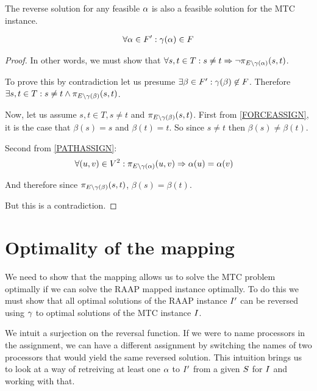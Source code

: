 \begin{lemma}
\label{REVERSEFEASABLE}
The reverse solution for any feasible $\alpha$ is also a feasible solution for the MTC instance.

\begin{align}
	\nonumber \forall \alpha \in F' : \gamma(\alpha) \in F
\end{align}
\end{lemma}
\begin{proof}
In other words, we must show that $\forall s, t \in T : s \neq t \Rightarrow \neg\pi_{E \setminus \gamma(\alpha)}(s, t)$.

To prove this by contradiction let us presume $\exists \beta \in F' : \gamma(\beta) \not\in F$.
Therefore $\exists s, t \in T : s \neq t \wedge \pi_{E \setminus \gamma(\beta)}(s, t)$.

Now, let us assume $s, t \in T, s \neq t$ and $\pi_{E \setminus \gamma(\beta)}(s, t)$.
First from \ref{FORCEASSIGN}, it is the case that $\beta(s) = s$ and $\beta(t) = t$.
So since $s \neq t$ then $\beta(s) \neq \beta(t)$.

Second from \ref{PATHASSIGN}:
\begin{align}
	\nonumber \forall (u, v) \in V^2 : \pi_{E \setminus \gamma(\alpha)}(u, v) & \Rightarrow \alpha(u) = \alpha(v)
\end{align}

And therefore since $\pi_{E \setminus \gamma(\beta)}(s, t)$, $\beta(s) = \beta(t)$.

But this is a contradiction.
\end{proof}

\section{Optimality of the mapping}
\label{secHardOpt}

We need to show that the mapping allows us to solve the MTC problem optimally if we can solve the RAAP mapped instance optimally.
To do this we must show that all optimal solutions of the RAAP instance $I'$ can be reversed using $\gamma$ to optimal solutions of the MTC instance $I$.

We intuit a surjection on the reversal function.
If we were to name processors in the assignment, we can have a different assignment by switching the names of two processors that would yield the same reversed solution.
This intuition brings us to look at a way of retreiving at least one $\alpha$ to $I'$ from a given $S$ for $I$ and working with that.


